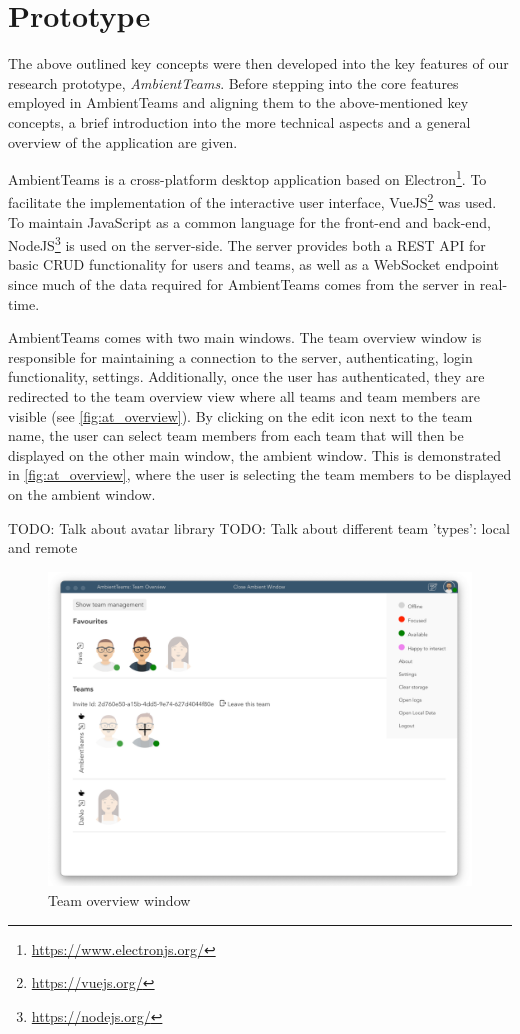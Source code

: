 \chapter{Prototype}
The above outlined key concepts were then developed into the key features of our research prototype, \textit{AmbientTeams}. Before stepping into the core features employed in AmbientTeams and aligning them to the above-mentioned key concepts, a brief introduction into the more technical aspects and a general overview of the application are given.

AmbientTeams is a cross-platform desktop application based on Electron\footnote{\url{https://www.electronjs.org/}}. To facilitate the implementation of the interactive user interface, VueJS\footnote{\url{https://vuejs.org/}} was used. To maintain JavaScript as a common language for the front-end and back-end, NodeJS\footnote{\url{https://nodejs.org/}} is used on the server-side. The server provides both a REST API for basic CRUD functionality for users and teams, as well as a WebSocket endpoint since much of the data required for AmbientTeams comes from the server in real-time.

AmbientTeams comes with two main windows. The team overview window is responsible for maintaining a connection to the server, authenticating, login functionality, settings. Additionally, once the user has authenticated, they are redirected to the team overview view where all teams and team members are visible (see \autoref{fig:at_overview}). By clicking on the edit icon next to the team name, the user can select team members from each team that will then be displayed on the other main window, the ambient window. This is demonstrated in \autoref{fig:at_overview}, where the user is selecting the team members to be displayed on the ambient window.

TODO: Talk about avatar library
TODO: Talk about different team 'types': local and remote


\begin{figure}[h]
    \centering
    \includegraphics[width=.8\linewidth]{./images/AT_overview.png}
    \caption{Team overview window }
    \label{fig:at_overview}
\end{figure}

